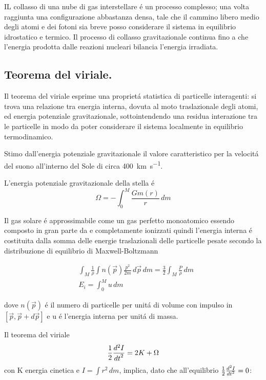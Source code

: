 \documentclass[../main.tex]{subfiles}
\begin{document}
\begingroup
\color{midnightblue}
IL collasso di una nube di gas interstellare \'e un processo complesso; una volta raggiunta una configurazione abbastanza densa, tale che il cammino libero medio degli atomi e dei fotoni sia breve posso considerare il sistema in equilibrio idrostatico e termico. Il processo di collasso gravitazionale continua fino a che l'energia prodotta dalle reazioni nucleari bilancia l'energia irradiata.
\endgroup


\subsection{Teorema del viriale.}

Il teorema del viriale esprime una propriet\'a statistica di particelle interagenti: si trova una relazione tra energia interna, dovuta al moto traslazionale degli atomi, ed energia potenziale gravitazionale, sottointendendo una residua interazione tra le particelle in modo da poter considerare il sistema localmente in equilibrio termodinamico.

\begingroup
\color{grey}
Stimo dall'energia potenziale gravitazionale il valore caratteristico per la velocit\'a del suono all'interno del Sole di circa \SI{400}{\kilo\meter\per\second}.
\endgroup

L'energia potenziale gravitazionale della stella \'e
\begin{equation}
\Omega=-\int_0^M\frac{Gm(r)}{r}\,dm\label{eq:energiapg}
\end{equation}

Il gas solare \'e approssimabile come un gas perfetto monoatomico essendo composto in gran parte da  e  completamente ionizzati quindi l'energia interna \'e costituita dalla somma delle energie traslazionali delle particelle pesate secondo la distribuzione di equilibrio di Maxwell-Boltzmann

\begin{align}
&\int_M\frac{1}{\rho}\int n(\vec{p})\frac{p^2}{2m}\,d\vec{p}\,dm=\frac{3}{2}\int_M\frac{P}{\rho}\,dm\\
&E_i=\int_0^Mu\,dm
\end{align}

dove $n(\vec{p})$ \'e il numero di particelle per unit\'a di volume con impulso in $[\vec{p},\vec{p}+d\vec{p}]$ e u \'e l'energia interna per unit\'a di massa.

Il teorema del viriale 
\begin{equation}
\frac{1}{2}\TtwoDy{t}{I}=2K+\Omega
\end{equation}
con K energia cinetica e $I=\int r^2\,dm$, implica, dato che all'equilibrio $\frac{1}{2}\TtwoDy{t}{I}=0$:
\end{document}
